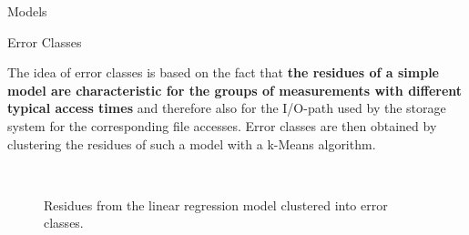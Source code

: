 \documentclass[final]{beamer}
\newlength{\onecolwid}
\begin{document}
\begin{frame}[t]
\begin{columns}[t]
\begin{column}{\onecolwid}
\begin{block}{Models}
	
\end{block}

\vspace*{-2cm}
\begin{block}{Error Classes}
	
The idea of error classes is based on the fact that \textbf{the residues of a simple model are characteristic for the groups of measurements with different typical access times} and therefore also for the I/O-path used by the storage system for the corresponding file accesses. 
Error classes are then obtained by clustering the residues of such a model with a k-Means algorithm.

	\begin{figure}
		\\
		\caption{Residues from the linear regression model clustered into error classes.}
		\label{error_classes}
	\end{figure} 


\end{block}
\end{column}
\end{columns}
\end{frame}
\end{document}
